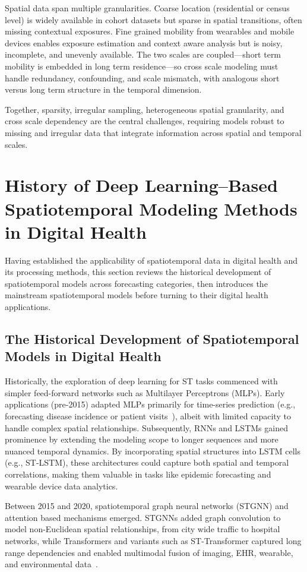 \documentclass[journal]{IEEEtran}
\begin{document}
Spatial data span multiple granularities. Coarse location (residential or census level) is widely available in cohort datasets but sparse in spatial transitions, often missing contextual exposures. Fine grained mobility from wearables and mobile devices enables exposure estimation and context aware analysis but is noisy, incomplete, and unevenly available. The two scales are coupled---short term mobility is embedded in long term residence---so cross scale modeling must handle redundancy, confounding, and scale mismatch, with analogous short versus long term structure in the temporal dimension.

Together, sparsity, irregular sampling, heterogeneous spatial granularity, and cross scale dependency are the central challenges, requiring models robust to missing and irregular data that integrate information across spatial and temporal scales.

\section{History of Deep Learning--Based Spatiotemporal Modeling Methods in Digital Health}
\label{sec:history}
Having established the applicability of spatiotemporal data in digital health and its processing methods, this section reviews the historical development of spatiotemporal models across forecasting categories, then introduces the mainstream spatiotemporal models before turning to their digital health applications.

\subsection{The Historical Development of Spatiotemporal Models in Digital Health}
Historically, the exploration of deep learning for ST tasks commenced with simpler feed-forward networks such as Multilayer Perceptrons (MLPs). Early applications (pre-2015) adapted MLPs primarily for time-series prediction (e.g., forecasting disease incidence or patient visits~\cite{miotto2018deeplearning}), albeit with limited capacity to handle complex spatial relationships. Subsequently, RNNs and LSTMs gained prominence by extending the modeling scope to longer sequences and more nuanced temporal dynamics. By incorporating spatial structures into LSTM cells (e.g., ST-LSTM), these architectures could capture both spatial and temporal correlations, making them valuable in tasks like epidemic forecasting and wearable device data analytics.

Between 2015 and 2020, spatiotemporal graph neural networks (STGNN) and attention based mechanisms emerged. STGNNs added graph convolution to model non-Euclidean spatial relationships, from city wide traffic to hospital networks, while Transformers and variants such as ST-Transformer captured long range dependencies and enabled multimodal fusion of imaging, EHR, wearable, and environmental data~\cite{caroprese2018deepehr}.
\end{document}

